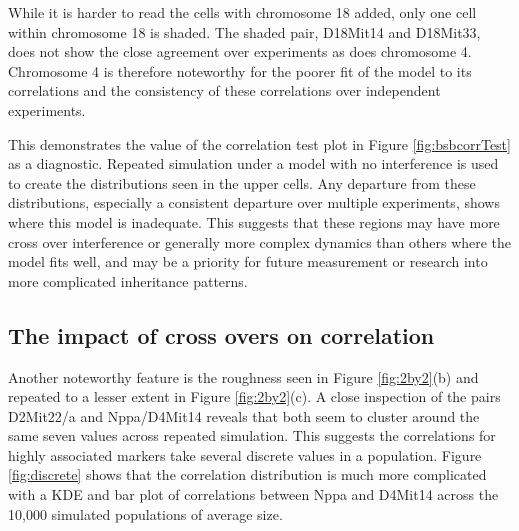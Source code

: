 \documentclass[sts]{imsart}
\begin{document}
While it is harder to read the cells with chromosome 18 added, only one cell within chromosome 18 is shaded. The shaded pair, D18Mit14 and D18Mit33, does not show the close agreement over experiments as does chromosome 4. Chromosome 4 is therefore noteworthy for the poorer fit of the model to its correlations and the consistency of these correlations over independent experiments.

This demonstrates the value of the correlation test plot in Figure \ref{fig:bsbcorrTest} as a diagnostic. Repeated simulation under a model with no interference is used to create the distributions seen in the upper cells. Any departure from these distributions, especially a consistent departure over multiple experiments, shows where this model is inadequate. This suggests that these regions may have more cross over interference or generally more complex dynamics than others where the model fits well, and may be a priority for future measurement or research into more complicated inheritance patterns.


\subsection{The impact of cross overs on correlation} \label{subsec:corrCountCO}

Another noteworthy feature is the roughness seen in Figure \ref{fig:2by2}(b) and repeated to a lesser extent in Figure \ref{fig:2by2}(c). A close inspection of the pairs D2Mit22/a and Nppa/D4Mit14 reveals that both seem to cluster around the same seven values across repeated simulation. This suggests the correlations for highly associated markers take several discrete values in a population. Figure \ref{fig:discrete} shows that the correlation distribution is much more complicated with a KDE and bar plot of correlations between Nppa and D4Mit14 across the 10,000 simulated populations of average size.
\end{document}
